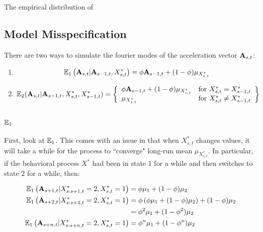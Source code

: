 The empirical distribution of 




\iffalse
\subsection{Model Misspecification}

There are two ways to simulate the fourier modes of the acceleration vector $\mathbf{A}_{s,t}$:

\begin{enumerate}
	\item $$\mathbb{E}_1\left(\mathbf{A}_{s,t} | \mathbf{A}_{s-1,t}, X^*_{s,t}\right) = \phi \mathbf{A}_{s-1,t} + (1-\phi) \mu_{X^*_{s,t}} $$
	
	\item $$\mathbb{E}_2(\mathbf{A}_{s,t} | \mathbf{A}_{s-1,t}, X^*_{s,t}, X^*_{s-1,t}) = \left\{\begin{array}{lr}
	\phi \mathbf{A}_{s-1,t} + (1-\phi) \mu_{X^*_{s,t}} & \text{for } X^*_{s,t} = X^*_{s-1,t}\\
	\mu_{X^*_{s,t}} & \text{for } X^*_{s,t} \neq X^*_{s-1,t}
	\end{array}\right\}$$
\end{enumerate}

\subsubsection{$\mathbb{E}_1$}

First, look at $\mathbb{E}_1$. This comes with an issue in that when $X^*_{s,t}$ changes values, it will take a while for the process to ``converge" long-run mean $\mu_{X^*_{s,t}}$. In particular, if the behavioral process $X^*$ had been in state 1 for a while and then switches to state 2 for a while, then:

\begin{align*}
	\mathbb{E}_1\left(\mathbf{A}_{s+1,t}|X^*_{s:s+1,t} = 2, X^*_{s,t} = 1\right) &=  \phi \mu_1 + (1-\phi) \mu_2 \\
	\mathbb{E}_1\left(\mathbf{A}_{s+2,t}|X^*_{s:s+2,t} = 2, X^*_{s,t} = 1\right) &= \phi\left( \phi \mu_1 + (1-\phi) \mu_2\right) + (1-\phi)\mu_2 \\
	&= \phi^2 \mu_1 + (1-\phi^2) \mu_2\\
	\mathbb{E}_1\left(\mathbf{A}_{s+n,t}|X^*_{s:s+n,t} = 2, X^*_{s,t} = 1\right) &=  \phi^n \mu_1 + (1-\phi^n) \mu_2 \\
\end{align*}

